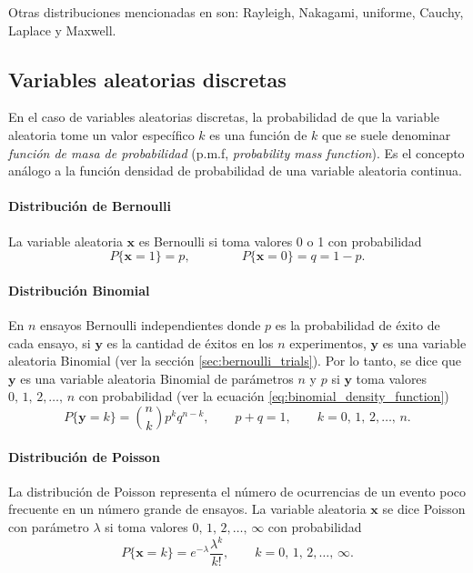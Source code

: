 \documentclass[a4paper]{report}
\newcommand{\x}{\mathbf{x}}
\newcommand{\y}{\mathbf{y}}
\begin{document}
Otras distribuciones mencionadas en \cite{papoulis2002probability} son: Rayleigh, Nakagami, uniforme, Cauchy, Laplace y Maxwell.

\subsection{Variables aleatorias discretas}\label{sec:discrete_random_variables}

En el caso de variables aleatorias discretas, la probabilidad de que la variable aleatoria tome un valor específico \(k\) es una función de \(k\) que se suele denominar \emph{función de masa de probabilidad} (p.m.f, \emph{probability mass function}). Es el concepto análogo a la función densidad de probabilidad de una variable aleatoria continua.

\paragraph{Distribución de Bernoulli} 

La variable aleatoria \(\x\) es Bernoulli si toma valores 0 o 1 con probabilidad
\[
 P\{\x=1\}=p,\qquad\qquad P\{\x=0\}=q=1-p.
\]

\paragraph{Distribución Binomial}

En \(n\) ensayos Bernoulli independientes donde \(p\) es la probabilidad de éxito de cada ensayo, si \(\y\) es la cantidad de éxitos en los \(n\) experimentos, \(\y\) es una variable aleatoria Binomial (ver la sección \ref{sec:bernoulli_trials}). Por lo tanto, se dice que \(\y\) es una variable aleatoria Binomial de parámetros \(n\) y \(p\) si \(\y\) toma valores \(0,\,1,\,2,\dots,\,n\) con probabilidad (ver la ecuación \ref{eq:binomial_density_function})
\begin{equation}\label{eq:binomial_density_function2}
 P\{\y=k\}=\binom{n}{k}p^{k}q^{n-k},\qquad p+q=1,\qquad k=0,\,1,\,2,\dots,\,n.
\end{equation}

\paragraph{Distribución de Poisson}

La distribución de Poisson representa el número de ocurrencias de un evento poco frecuente en un número grande de ensayos. La variable aleatoria \(\x\) se dice Poisson con parámetro \(\lambda\) si toma valores \(0,\,1,\,2,\dots,\,\infty\) con probabilidad
\[
 P\{\x=k\}=e^{-\lambda}\frac{\lambda^k}{k!},\qquad k=0,\,1,\,2,\dots,\,\infty.
\]
\end{document}
